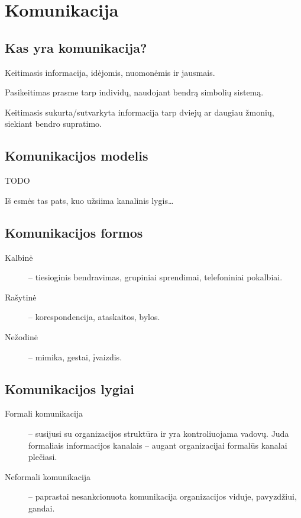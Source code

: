 \chapter{Komunikacija}

\section{Kas yra komunikacija?}

\begin{defn}[Komunikacija]
  Keitimasis informacija, idėjomis, nuomonėmis ir jausmais.
\end{defn}

\begin{defn}[Komunikacija]
  Pasikeitimas prasme tarp individų, naudojant bendrą simbolių sistemą.
\end{defn}

\begin{defn}[Komunikacija]
  Keitimasis sukurta/sutvarkyta informacija tarp dviejų ar daugiau
  žmonių, siekiant bendro supratimo.
\end{defn}

\section{Komunikacijos modelis}

TODO

Iš esmės tas pats, kuo užsiima kanalinis lygis…

\section{Komunikacijos formos}

\begin{description}
  \item[Kalbinė] – tiesioginis bendravimas, grupiniai sprendimai,
    telefoniniai pokalbiai.
  \item[Rašytinė] – korespondencija, ataskaitos, bylos.
  \item[Nežodinė] – mimika, gestai, įvaizdis.
\end{description}

\section{Komunikacijos lygiai}

\begin{description}
  \item[Formali komunikacija] – susijusi su organizacijos struktūra ir
    yra kontroliuojama vadovų. Juda formaliais informacijos kanalais
    – augant organizacijai formalūs kanalai plečiasi.
  \item[Neformali komunikacija] – paprastai nesankcionuota komunikacija
    organizacijos viduje, pavyzdžiui, gandai.
\end{description}

